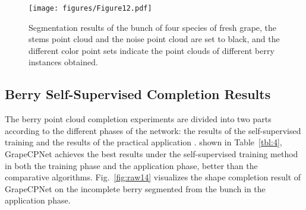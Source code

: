 \documentclass[12pt]{article}
\begin{document}
\begin{figure}[hbt!]
    \centering
    \texttt{[image: figures/Figure12.pdf]}
    \caption{Segmentation results of the bunch of four species of fresh grape, the stems point cloud and the noise point cloud are set to black, and the different color point sets indicate the point clouds of different berry instances obtained.}
    \label{fig:raw13}
\end{figure}

\subsection{Berry Self-Supervised Completion Results}
\label{sec:32}

The berry point cloud completion experiments are divided into two parts according to the different phases of the network: 
the results of the self-supervised training  and the results of the practical application .
 shown in Table~\ref{tbl:4}, 
GrapeCPNet achieves the best results under the self-supervised training method in both the training phase and the application phase, better than the comparative algorithms. Fig.~\ref{fig:raw14} visualizes the shape completion result of GrapeCPNet on the incomplete berry segmented from the bunch in the application phase.
\end{document}
